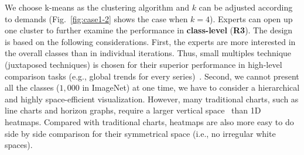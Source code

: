 \documentclass[format=acmsmall, review=false, screen=true]{acmart}
\begin{document}
We choose k-means as the clustering algorithm and $k$ can be adjusted according to demands (Fig.~\ref{fig:case1-2} shows the case when $k=4$).
Experts can open up one cluster to further examine the performance in \textbf{class-level} (\textbf{R3}). 
The design is based on the following considerations.
First, the experts are more interested in the overall classes than in individual iterations.
Thus, small multiples technique (juxtaposed techniques) is chosen for their superior performance in high-level comparison tasks (e.g., global trends for every series)~\cite{javed2010graphical}.
Second, we cannot present all the classes ($1,000$ in ImageNet) at one time, we have to consider a hierarchical and highly space-efficient visualization.
However, many traditional charts, such as line charts and horizon graphs, require a larger vertical space~\cite{heer2009sizing} than 1D heatmaps.
Compared with traditional charts, heatmaps are also more easy to do side by side comparison for their symmetrical space (i.e., no irregular white spaces).
\end{document}
